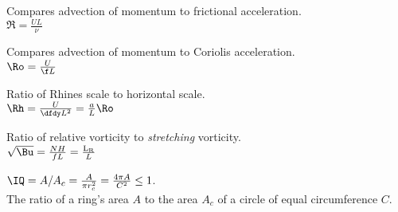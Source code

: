 \begin{fullwidth}
\begin{multicols}{2}


\begin{definition} \label{def:Re}
Compares advection of momentum to frictional acceleration.\\
$\Re = \frac{U L}{\nu}$
\end{definition}
\begin{definition} \label{def:Ro}
Compares advection of momentum to Coriolis acceleration.\\
$\Ro = \frac{U }{\f L}$
\end{definition}
\begin{definition}\label{def:Rh}
Ratio of Rhines scale to horizontal scale.\\
$\Rh = \frac{U }{\dfdy L^2} = \frac{a}{L} \Ro$
\end{definition}
\begin{definition}\label{def:Bu}
Ratio of relative vorticity to \textit{stretching} vorticity.\\
$\sqrt{\Bu}=\frac{N H}{f L}=\frac{\mathrm{L_R}}{L}$
\end{definition}
\begin{definition}\label{def:IQ}
$\IQ=A/A_{c}=\frac{A}{\pi r^2_{c}}=\frac{4 \pi A}{C^2} \le 1$.\\
The ratio of a ring's area $A$ to the area $A_{c}$ of a circle of equal circumference $C$.
\end{definition}




\end{multicols}
\end{fullwidth}
